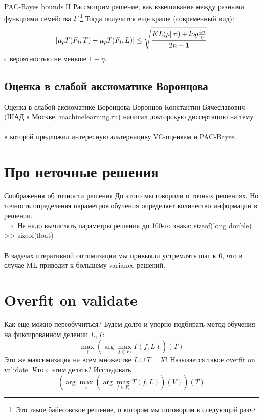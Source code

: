 \documentclass[14pt, fleqn, xcolor={dvipsnames, table}]{beamer}
\begin{document}
\begin{frame}{PAC-Bayes bounds II}
\small
Рассмотрим решение, как взвешивание между разными функциями семейства $F$.\footnote{Это такое байесовское решение, о котором мы поговорим в следующий раз} Тогда получится еще краше (современный вид):
$$
|\mu_\rho T(F_i, T) - \mu_\rho T(F_i, L)| \le \sqrt{KL(\rho \| \pi) + log \frac{4n}{\eta} \over 2n - 1}
$$
с вероятностью не меньше $1-\eta$.
\end{frame}

\subsection{Оценка в слабой аксиоматике Воронцова}
\begin{frame}{Оценка в слабой аксиоматике Воронцова}
Воронцов Константин Вячеславович (ШАД в Москве, machinelearning.ru) написал докторскую диссертацию на тему \\
 \\
\flushleft в которой предложил интересную альтернациву VC-оценкам и PAC-Bayes.
\end{frame}

\section{Про неточные решения}
\begin{frame}{Соображения об точности решения}
До этого мы говорили о точных решениях. Но точность определения параметров обучения определяет количество информации в решении. \\
$\Rightarrow$ Не надо вычислять параметры решения до 100-го знака: sizeof(long double) >> sizeof(float) \\
~\\
В задачах итеративной оптимизации мы привыкли устремлять шаг к 0, что в случае ML приводит к большему variance решений.
\end{frame}

\section{Overfit on validate}
\begin{frame}{Как еще можно переобучиться?}
Будем долго и упорно подбирать метод обучения на фиксированном делении $L, T$:
$$
\max_{i} \left(\arg\max_{f \in F_i} T(f, L)\right)(T)
$$
Это же максимизация на всем множестве $L \cup T = X$! Называется такое overfit on validate. Что с этим делать? Исследовать
$$
\left(\arg \max_{i} \left(\arg\max_{f \in F_i} T(f, L)\right)(V)\right)(T)
$$
\end{frame}
\end{document}
